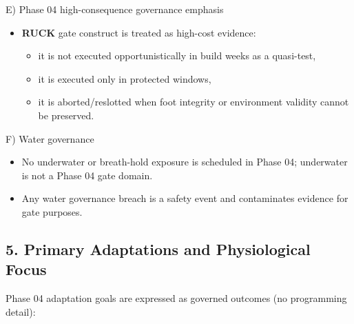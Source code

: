 \documentclass[10pt]{article}
\begin{document}
E) Phase 04 high-consequence governance emphasis

\begin{itemize}
\item \textbf{RUCK} gate construct is treated as high-cost evidence:
  \begin{itemize}
  \item it is not executed opportunistically in build weeks as a quasi-test,
  \item it is executed only in protected windows,
  \item it is aborted/reslotted when foot integrity or environment validity cannot be preserved.
  \end{itemize}
\end{itemize}

F) Water governance

\begin{itemize}
\item No underwater or breath-hold exposure is scheduled in Phase 04; underwater is not a Phase 04 gate domain.
\item Any water governance breach is a safety event and contaminates evidence for gate purposes.
\end{itemize}

\subsection*{5. Primary Adaptations and Physiological Focus}


Phase 04 adaptation goals are expressed as governed outcomes (no programming detail):
\end{document}
